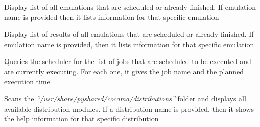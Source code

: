 \documentclass[letterpaper,10pt,english]{sphinxhowto}
\begin{document}
\begin{fulllineitems}
\label{COCOMA/02_how_to_use_it:cmdoption-ccmsh-l}
Display list of all emulations that are scheduled or already finished. If emulation name is provided then it lists information for that specific emulation

\end{fulllineitems}


\begin{fulllineitems}
\label{COCOMA/02_how_to_use_it:cmdoption-ccmsh-r}
Display list of results of all emulations that are scheduled or already finished. If emulation name is provided, then it lists information for that specific emulation

\end{fulllineitems}


\begin{fulllineitems}
\label{COCOMA/02_how_to_use_it:cmdoption-ccmsh-j}
Queries the scheduler for the list of jobs that are scheduled to be executed and are currently executing. For each one, it gives the job name and the planned execution time

\end{fulllineitems}


\begin{fulllineitems}
\label{COCOMA/02_how_to_use_it:cmdoption-ccmsh-i}
Scans the \emph{``/usr/share/pyshared/cocoma/distributions''} folder and displays all available distribution modules. If a distribution name is provided, then it shows the help information for that specific distribution

\end{fulllineitems}
\end{document}
